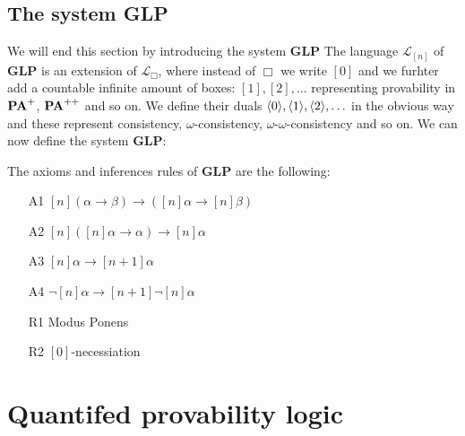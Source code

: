 \documentclass[../main.tex]{subfiles}
\begin{document}
\subsection{The system \textbf{GLP}}
We will end this section by introducing the system \textbf{GLP}
The language $\mathcal{L}_{[n]}$ of \textbf{GLP} is an extension of
$\mathcal{L}_\Box$, where instead of $\Box$ we write $[0]$ and we furhter add
a countable infinite amount of boxes:
$[1],[2],\ldots$ representing provability in $\text{\textbf{PA}}^+$, $\text{\textbf{PA}}^{++}$ and so on. We
define their duals $\langle 0\rangle,\langle 1\rangle, \langle 2\rangle,\ldots$ in the obvious way and
these represent consistency, $\omega$-consistency,
$\omega$-$\omega$-consistency and so on. We can now define the system
\textbf{GLP}:
\begin{defi}
	The axioms and inferences rules of \textbf{GLP} are the following:
	\begin{enumerate}
		\item[A1]
			$[n](\alpha\rightarrow\beta)\rightarrow([n]\alpha\rightarrow[n]\beta)$
		\item[A2] $[n]([n]\alpha\rightarrow\alpha)\rightarrow[n]\alpha$
		\item[A3] $[n]\alpha\rightarrow[n+1]\alpha$
		\item[A4] $\neg[n]\alpha\rightarrow[n+1]\neg[n]\alpha$
		\item[R1] Modus Ponens
		\item[R2] $[0]$-necessiation
	\end{enumerate}
\end{defi}

\section{Quantifed provability logic}
\end{document}
